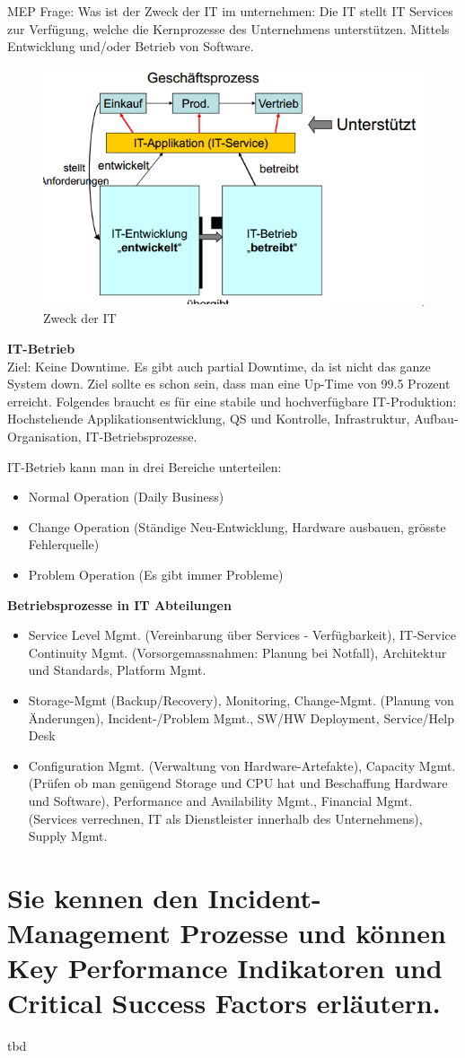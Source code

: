 MEP Frage: Was ist der Zweck der IT im unternehmen:
\label{zweck-der-it-im-unternehmen}
Die IT stellt IT Services zur Verfügung, welche die Kernprozesse des Unternehmens unterstützen. Mittels Entwicklung und/oder Betrieb von Software.

\begin{figure}[h!]
	\centering
	\includegraphics{fig/zweck-der-it}
	\caption{Zweck der IT}
\end{figure}

\textbf{IT-Betrieb}\\
Ziel: Keine Downtime. Es gibt auch partial Downtime, da ist nicht das ganze System down. Ziel sollte es schon sein, dass man eine Up-Time von 99.5 Prozent erreicht. Folgendes braucht es für eine stabile und hochverfügbare IT-Produktion: Hochstehende Applikationsentwicklung, QS und Kontrolle, Infrastruktur, Aufbau-Organisation, IT-Betriebsprozesse.

IT-Betrieb kann man in drei Bereiche unterteilen: 

\begin{itemize}
	\item Normal Operation (Daily Business)
	\item Change Operation (Ständige Neu-Entwicklung, Hardware ausbauen, grösste Fehlerquelle)
	\item Problem Operation (Es gibt immer Probleme)
\end{itemize}

\textbf{Betriebsprozesse in IT Abteilungen}
\begin{itemize}
	\item Service Level Mgmt. (Vereinbarung über Services - Verfügbarkeit), IT-Service Continuity Mgmt. (Vorsorgemassnahmen: Planung bei Notfall), Architektur und Standards, Platform Mgmt.
	
	\item Storage-Mgmt (Backup/Recovery), Monitoring, Change-Mgmt. (Planung von Änderungen),  Incident-/Problem Mgmt., SW/HW Deployment, Service/Help Desk
	
	\item Configuration Mgmt. (Verwaltung von Hardware-Artefakte), Capacity Mgmt. (Prüfen ob man genügend Storage und CPU hat und Beschaffung Hardware und Software), Performance and Availability Mgmt., Financial Mgmt. (Services verrechnen, IT als Dienstleister innerhalb des Unternehmens), Supply Mgmt.
\end{itemize}

\section{Sie kennen den Incident-Management Prozesse und
	können Key Performance Indikatoren und Critical Success
	Factors erläutern.}
tbd